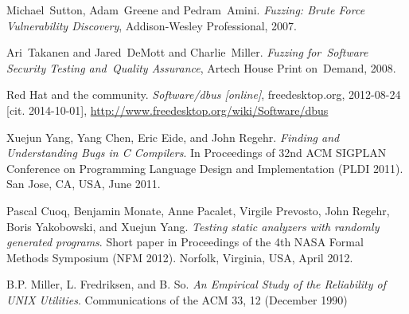 \documentclass[conference]{IEEEtran}
\begin{document}


%
%
%
\begin{thebibliography}{1}

Michael~Sutton, Adam~Greene and Pedram~Amini. \emph{Fuzzing: Brute Force
Vulnerability Discovery}, Addison-Wesley Professional, 2007.

Ari~Takanen and Jared~DeMott and Charlie~Miller. \emph{Fuzzing for~Software
Security Testing and~Quality Assurance}, Artech House Print on~Demand, 2008.

Red Hat and the community. \emph{Software/dbus [online]}, freedesktop.org,
2012-08-24 [cit. 2014-10-01],
\url{http://www.freedesktop.org/wiki/Software/dbus}

Xuejun Yang, Yang Chen, Eric Eide, and John Regehr. \emph{Finding and
Understanding Bugs in C Compilers}. In Proceedings of 32nd ACM SIGPLAN
Conference on Programming Language Design and Implementation (PLDI 2011). San Jose, CA, USA, June 2011.

Pascal Cuoq, Benjamin Monate, Anne Pacalet, Virgile Prevosto, John Regehr, Boris
Yakobowski, and Xuejun Yang. \emph{Testing static analyzers with randomly
generated programs}. Short paper in Proceedings of the 4th NASA Formal Methods Symposium (NFM 2012). Norfolk, Virginia, USA, April 2012.

B.P. Miller, L. Fredriksen, and B. So. \emph{An Empirical
Study of the Reliability of UNIX Utilities}. Communications of the ACM 33, 12
(December 1990)

\end{thebibliography}
\end{document}
